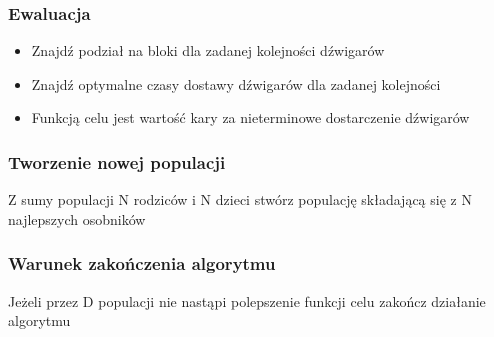 \documentclass{beamer}
\begin{document}
 
 
 \begin{frame}
 \frametitle{ Ewaluacja }
 \begin{itemize}
  \item Znajdź podział na bloki dla zadanej kolejności dźwigarów
  \item Znajdź optymalne czasy dostawy dźwigarów dla zadanej kolejności
  \item Funkcją celu jest wartość kary za nieterminowe dostarczenie dźwigarów
 \end{itemize}
 
 \end{frame}
 
 
 \begin{frame}
 \frametitle{ Tworzenie nowej populacji }
 Z sumy populacji N rodziców i N dzieci stwórz populację składającą się z N najlepszych osobników

\end{frame}


 \begin{frame}
 \frametitle{ Warunek zakończenia algorytmu }
Jeżeli przez D populacji nie nastąpi polepszenie funkcji celu zakończ działanie algorytmu

\end{frame}
\end{document}

